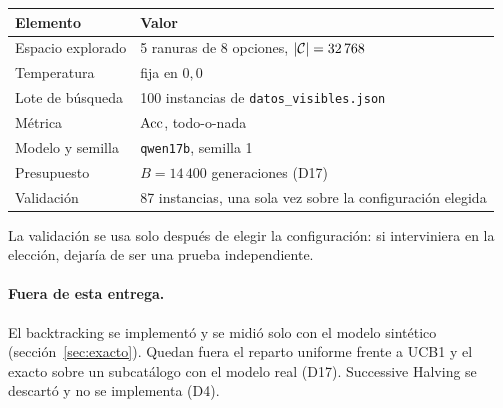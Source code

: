 \begin{center}
\begin{tabular}{ll}
\toprule
Elemento & Valor \\
\midrule
Espacio explorado & 5 ranuras de 8 opciones, $|\mathcal{C}|=32\,768$ \\
Temperatura & fija en $0{,}0$ \\
Lote de búsqueda & 100 instancias de \texttt{datos\_visibles.json} \\
Métrica & $\operatorname{Acc}$, todo-o-nada \\
Modelo y semilla & \texttt{qwen17b}, semilla 1 \\
Presupuesto & $B=14\,400$ generaciones (D17) \\
Validación & 87 instancias, una sola vez sobre la configuración elegida \\
\bottomrule
\end{tabular}
\end{center}

La validación se usa solo después de elegir la configuración: si interviniera en la
elección, dejaría de ser una prueba independiente.

\paragraph{Fuera de esta entrega.} El backtracking se implementó y se midió solo con el
modelo sintético (sección~\ref{sec:exacto}). Quedan fuera el reparto uniforme frente a UCB1
y el exacto sobre un subcatálogo con el modelo real (D17). Successive Halving se descartó y
no se implementa (D4).
